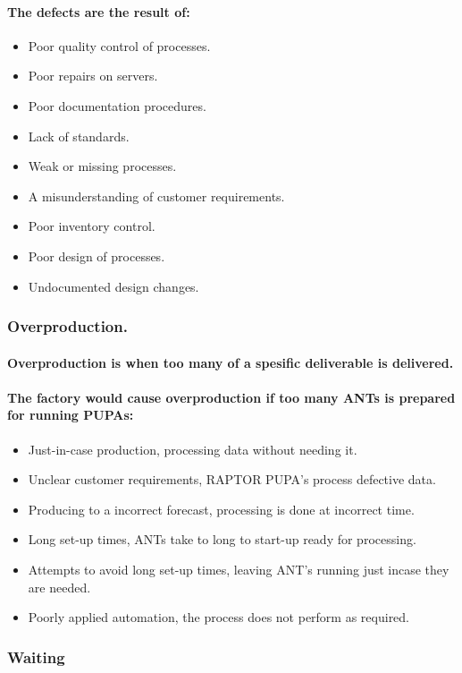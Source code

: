 \documentclass{acm_proc_article-sp}
\begin{document}
\paragraph{The defects are the result of:}
\begin{itemize}
\item Poor quality control of processes.
\item Poor repairs on servers.
\item Poor documentation procedures.
\item Lack of standards.
\item Weak or missing processes.
\item A misunderstanding of customer requirements.
\item Poor inventory control.
\item Poor design of processes.
\item Undocumented design changes.
\end{itemize}
\subsubsection{Overproduction.}
\paragraph{Overproduction is when too many of a spesific deliverable is delivered.}
\paragraph{The factory would cause overproduction if too many ANTs is prepared for running PUPAs:}
\begin{itemize}
\item Just-in-case production, processing data without needing it.
\item Unclear customer requirements, RAPTOR PUPA's process defective data.
\item Producing to a incorrect forecast, processing is done at incorrect time.
\item Long set-up times, ANTs take to long to start-up ready for processing.
\item Attempts to avoid long set-up times, leaving ANT's running just incase they are needed.
\item Poorly applied automation, the process does not perform as required. 
\end{itemize}
\subsubsection{Waiting}
\end{document}
